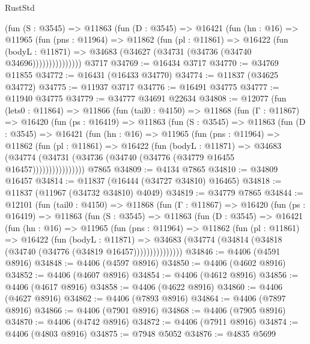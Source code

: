 \begin{lexlean}{RustStd}
\begin{coremodule}
{\begin{coremodule}
{{{{{{{{{{{{{{{{{{{{{{{{{{{{{{{{{{{{{{{{{{{{{{{{{{              (fun (S : @3545) =>
              @11863
                (fun (D : @3545) =>
                @16421
                  (fun (hn : @16) =>
                  @11965
                    (fun (pns : @11964) =>
                    @11862
                      (fun (pl : @11861) =>
                      @16422
                        (fun (bodyL : @11871) =>
                        @34683 (@34627 (@34731 (@34736 (@34740 @34696)))))))))))))))
    @3717
@34769 := @16434 @3717
@34770 := @34769 @11855
@34772 := @16431 (@16433 @34770)
@34774 := @11837 (@34625 @34772)
@34775 := @11937 @3717
@34776 := @16491 @34775
@34777 := @11940 @34775
@34779 := @34777 @34691 @22634
@34808 := @12077
    (fun (lets0 : @11864) =>
    @11866
      (fun (tail0 : @4150) =>
      @11868
        (fun (Γ : @11867) =>
        @16420
          (fun (ps : @16419) =>
          @11863
            (fun (S : @3545) =>
            @11863
              (fun (D : @3545) =>
              @16421
                (fun (hn : @16) =>
                @11965
                  (fun (pns : @11964) =>
                  @11862
                    (fun (pl : @11861) =>
                    @16422
                      (fun (bodyL : @11871) =>
                      @34683
                        (@34774
                          (@34731 (@34736 (@34740 (@34776 (@34779 @16455 @16457))))))))))))))))
    @7865
@34809 := @4134 @7865
@34810 := @34809 @16457
@34814 := @11837 (@16444 (@34727 @34810) @16465)
@34818 := @11837 (@11967 (@34732 @34810) @4049)
@34819 := @34779 @7865
@34844 := @12101
    (fun (tail0 : @4150) =>
    @11868
      (fun (Γ : @11867) =>
      @16420
        (fun (ps : @16419) =>
        @11863
          (fun (S : @3545) =>
          @11863
            (fun (D : @3545) =>
            @16421
              (fun (hn : @16) =>
              @11965
                (fun (pns : @11964) =>
                @11862
                  (fun (pl : @11861) =>
                  @16422
                    (fun (bodyL : @11871) =>
                    @34683 (@34774 (@34814 (@34818 (@34740 (@34776 (@34819 @16457)))))))))))))))
@34846 := @4406 (@4591 @8916)
@34848 := @4406 (@4597 @8916)
@34850 := @4406 (@4602 @8916)
@34852 := @4406 (@4607 @8916)
@34854 := @4406 (@4612 @8916)
@34856 := @4406 (@4617 @8916)
@34858 := @4406 (@4622 @8916)
@34860 := @4406 (@4627 @8916)
@34862 := @4406 (@7893 @8916)
@34864 := @4406 (@7897 @8916)
@34866 := @4406 (@7901 @8916)
@34868 := @4406 (@7905 @8916)
@34870 := @4406 (@4742 @8916)
@34872 := @4406 (@7911 @8916)
@34874 := @4406 (@4803 @8916)
@34875 := @7948 @5052
@34876 := @4835 @5699
}}}}}}}}}}}}}}}}}}}}}}}}}}}}}}}}}}}}}}}}}}}}}}}}}}
\end{coremodule}}
\end{coremodule}
\end{lexlean}
